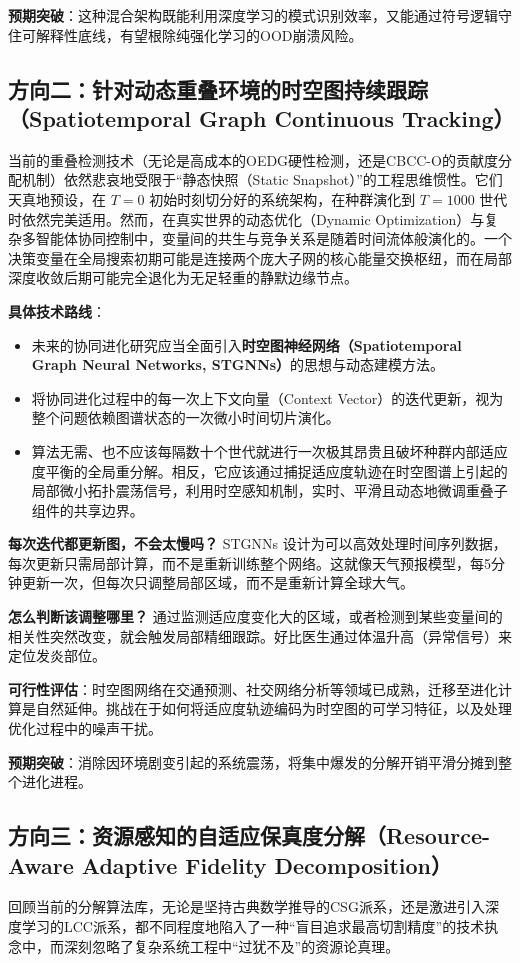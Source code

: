\textbf{预期突破}：这种混合架构既能利用深度学习的模式识别效率，又能通过符号逻辑守住可解释性底线，有望根除纯强化学习的OOD崩溃风险。

\subsection{方向二：针对动态重叠环境的时空图持续跟踪（Spatiotemporal Graph Continuous Tracking）}
当前的重叠检测技术（无论是高成本的OEDG硬性检测，还是CBCC-O的贡献度分配机制）依然悲哀地受限于“静态快照（Static Snapshot）”的工程思维惯性。它们天真地预设，在 $T=0$ 初始时刻切分好的系统架构，在种群演化到 $T=1000$ 世代时依然完美适用。然而，在真实世界的动态优化（Dynamic Optimization）与复杂多智能体协同控制中，变量间的共生与竞争关系是随着时间流体般演化的。一个决策变量在全局搜索初期可能是连接两个庞大子网的核心能量交换枢纽，而在局部深度收敛后期可能完全退化为无足轻重的静默边缘节点。

\textbf{具体技术路线}：
\begin{itemize}
    \item 未来的协同进化研究应当全面引入\textbf{时空图神经网络（Spatiotemporal Graph Neural Networks, STGNNs）}的思想与动态建模方法。
    \item 将协同进化过程中的每一次上下文向量（Context Vector）的迭代更新，视为整个问题依赖图谱状态的一次微小时间切片演化。
    \item 算法无需、也不应该每隔数十个世代就进行一次极其昂贵且破坏种群内部适应度平衡的全局重分解。相反，它应该通过捕捉适应度轨迹在时空图谱上引起的局部微小拓扑震荡信号，利用时空感知机制，实时、平滑且动态地微调重叠子组件的共享边界。
\end{itemize}

\textbf{每次迭代都更新图，不会太慢吗？} STGNNs 设计为可以高效处理时间序列数据，每次更新只需局部计算，而不是重新训练整个网络。这就像天气预报模型，每5分钟更新一次，但每次只调整局部区域，而不是重新计算全球大气。

\textbf{怎么判断该调整哪里？} 通过监测适应度变化大的区域，或者检测到某些变量间的相关性突然改变，就会触发局部精细跟踪。好比医生通过体温升高（异常信号）来定位发炎部位。

\textbf{可行性评估}：时空图网络在交通预测、社交网络分析等领域已成熟，迁移至进化计算是自然延伸。挑战在于如何将适应度轨迹编码为时空图的可学习特征，以及处理优化过程中的噪声干扰。

\textbf{预期突破}：消除因环境剧变引起的系统震荡，将集中爆发的分解开销平滑分摊到整个进化进程。

\subsection{方向三：资源感知的自适应保真度分解（Resource-Aware Adaptive Fidelity Decomposition）}
回顾当前的分解算法库，无论是坚持古典数学推导的CSG派系，还是激进引入深度学习的LCC派系，都不同程度地陷入了一种“盲目追求最高切割精度”的技术执念中，而深刻忽略了复杂系统工程中“过犹不及”的资源论真理。

